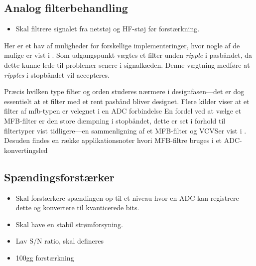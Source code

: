 \subsection{Analog filterbehandling}
\begin{itemize}
    \item Skal filtrere signalet fra netstøj og HF-støj før forstærkning. 
\end{itemize}

Her er et hav af muligheder for forskellige implementeringer, hvor nogle af de mulige er vist i . Som udgangspunkt vægtes et filter unden \emph{ripple} i pasbåndet, da dette kunne lede til problemer senere i signalkæden. Denne vægtning medføre at \emph{ripples} i stopbåndet vil accepteres.\tbr
{}


Præcis hvilken type filter og orden studeres nærmere i designfasen---det er dog essentielt at et filter med et rent pasbånd bliver designet. Flere kilder viser at et filter af \acrlong{mfb}-typen er velegnet i en ADC forbindelse \cite[s.~413]{Horowitz2015}
En fordel ved at vælge et MFB-filter er den store dæmpning i stopbåndet, dette er set i forhold til filtertyper\cite{ADCMFBTI} vist tidligere---en sammenligning af et MFB-filter og VCVS\tbr er vist i . Desuden findes en række applikationsnoter hvori MFB-filtre bruges i et ADC-konvertingsled\cite{OPA344Data}\tbr

\subsection{Spændingsforstærker}
\begin{itemize}
    \item Skal forstærkere spændingen op til et niveau hvor en ADC kan registrere dette og konvertere til kvanticerede bits.
    \item Skal have en stabil strømforsyning.
    \item Lav S/N ratio, \tbr skal defineres
    \item 100gg forstærkning \tbr
\end{itemize}
